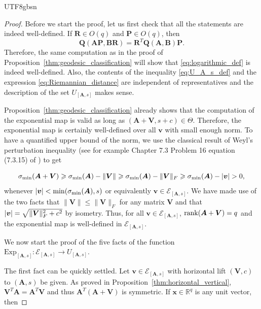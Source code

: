 \documentclass[12pt]{report}
\theoremstyle{plain}
\theoremstyle{definition}
\begin{document}
\begin{CJK*}{UTF8}{gbsn}
\begin{proof}
Before we start the proof, let us first check that all the 
statements are indeed well-defined.
If $\bm{R} \in O(q)$ and $\bm{P} \in O(q)$,
then 
\begin{equation}\label{eq:Q_A_B_RP}
  \bm{Q}(\bm{A}\bm{P},\bm{B}\bm{R}) = \bm{R}^T\bm{Q}(\bm{A},\bm{B})\bm{P}.
\end{equation}
Therefore,
the same computation as in the proof of Proposition~\ref{thm:geodesic_classification} will show that 
\eqref{eq:logarithmic_def} is indeed well-defined.
Also, the contents of the inequality \eqref{eq:U_A_s_def} 
and the expression \eqref{eq:Riemannian_distance}
are independent of representatives and the description of 
the set $U_{[\bm{A},s]}$ makes sense.

Proposition~\ref{thm:geodesic_classification} already shows 
that the computation of the exponential map is valid as long as 
$(\bm{A} + \bm{V}, s + c) \in \Theta$.
Therefore, the exponential map is certainly well-defined 
over all $\bm{v}$ with small enough norm.
To have a quantified upper bound of the norm,
we use the classical result of
Weyl's perturbation inequality 
(see for example Chapter 7.3 Problem 16 equation (7.3.15) of \citealp{Horn_Johnson_2013})
to get

\begin{equation*}
  \sigma_{\text{min}}(\bm{A} + \bm{V}) \geqslant \sigma_{\text{min}}(\bm{A}) - \|\bm{V}\|
  \geqslant \sigma_{\text{min}}(\bm{A}) - \|\bm{V}\|_F \geqslant \sigma_{\text{min}}(\bm{A}) - \abs{\bm{v}} > 0,
\end{equation*}
whenever $\abs{\bm{v}} < \min(\sigma_{\text{min}}(\bm{A}),s)$
or equivalently $\bm{v} \in \mathcal{E}_{[\bm{A},s]}$.
We have made use of the two facts that 
$\|\bm{V}\| \leqslant \|\bm{V}\|_F$
for any matrix $\bm{V}$
and that $\abs{\bm{v}}=\sqrt{\|\bm{V}\|_F^2+c^2}$
by isometry.
Thus, for all $\bm{v} \in \mathcal{E}_{[\bm{A},s]}$, $\rank(\bm{A} + \bm{V}) = q$
and the exponential map is well-defined in $\mathcal{E}_{[\bm{A},s]}$.

We now start the proof of the five facts 
of the function $\text{Exp}_{[\bm{A},s]}: \mathcal{E}_{[\bm{A},s]} \to U_{[\bm{A},s]}$.

The first fact can be quickly settled.
Let $\bm{v} \in \mathcal{E}_{[\bm{A},s]}$
with horizontal lift $(\bm{V},c)$ to $(\bm{A},s)$ be given.
As proved in Proposition~\ref{thm:horizontal_vertical},
$\bm{V}^T\bm{A} = \bm{A}^T\bm{V}$ and thus
$\bm{A}^T(\bm{A}+\bm{V})$ is symmetric.
If $\bm{x} \in \mathbb{R}^q$ is any unit vector, then 


\end{proof}
\end{CJK*}
\end{document}
